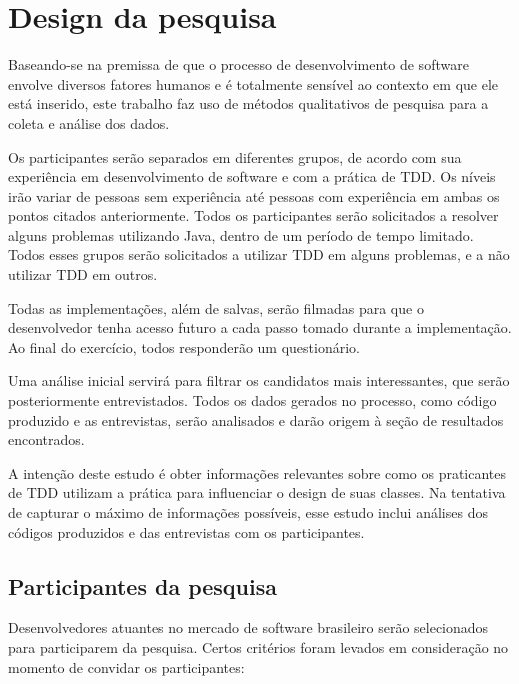 \section{Design da pesquisa}

Baseando-se na premissa de que o processo de desenvolvimento de software envolve 
diversos fatores humanos e é totalmente sensível ao contexto em que ele está 
inserido, este trabalho faz uso de métodos qualitativos de pesquisa para a coleta e 
análise dos dados.

Os participantes serão separados em diferentes grupos, de acordo com sua
experiência em desenvolvimento de software e com a prática de TDD. Os níveis
irão variar de pessoas sem experiência até pessoas com experiência em ambas
os pontos citados anteriormente.
Todos os participantes serão
solicitados a resolver alguns problemas utilizando Java, dentro de um
período de tempo limitado. Todos esses grupos
serão solicitados a utilizar TDD em alguns problemas, e a não utilizar
TDD em outros.

Todas as implementações,
além de salvas, serão filmadas para que o desenvolvedor tenha acesso futuro
a cada passo tomado durante a implementação.
Ao final do exercício,
todos responderão um questionário.

Uma análise inicial servirá para filtrar os candidatos
mais interessantes, que serão posteriormente entrevistados. 
Todos os dados gerados no processo,
como código produzido e as entrevistas, serão analisados e darão origem
à seção de resultados encontrados.

A intenção deste estudo é obter informações relevantes sobre como os
praticantes de TDD utilizam a prática para influenciar o design de suas
classes. Na tentativa de capturar o máximo de informações possíveis, esse estudo
inclui análises dos códigos produzidos e das entrevistas com os participantes.

\subsection{Participantes da pesquisa}
\label{sec:planejamento-participantes}

Desenvolvedores atuantes no mercado de 
software brasileiro serão selecionados para participarem da pesquisa.
Certos critérios foram levados em consideração no momento de convidar os participantes:

